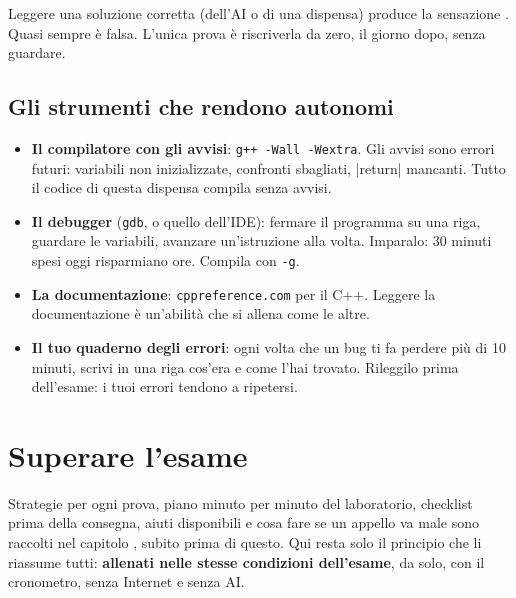 \begin{trappola}
Leggere una soluzione corretta (dell'AI o di una dispensa) produce la sensazione
. Quasi sempre è falsa. L'unica prova è riscriverla da zero,
il giorno dopo, senza guardare.
\end{trappola}

\subsection*{Gli strumenti che rendono autonomi}

\begin{itemize}
  \item \textbf{Il compilatore con gli avvisi}: \texttt{g++ -Wall -Wextra}. Gli avvisi
        sono errori futuri: variabili non inizializzate, confronti sbagliati, \cc|return|
        mancanti. Tutto il codice di questa dispensa compila senza avvisi.
  \item \textbf{Il debugger} (\texttt{gdb}, o quello dell'IDE): fermare il programma su una
        riga, guardare le variabili, avanzare un'istruzione alla volta. Imparalo: 30
        minuti spesi oggi risparmiano ore. Compila con \texttt{-g}.
  \item \textbf{La documentazione}: \texttt{cppreference.com} per il C++. Leggere la
        documentazione è un'abilità che si allena come le altre.
  \item \textbf{Il tuo quaderno degli errori}: ogni volta che un bug ti fa perdere più di
        10 minuti, scrivi in una riga cos'era e come l'hai trovato. Rileggilo prima
        dell'esame: i tuoi errori tendono a ripetersi.
\end{itemize}

\section{Superare l'esame}

Strategie per ogni prova, piano minuto per minuto del laboratorio, checklist
prima della consegna, aiuti disponibili e cosa fare se un appello va male sono
raccolti nel capitolo , subito prima di
questo. Qui resta solo il principio che li riassume tutti: \textbf{allenati nelle
stesse condizioni dell'esame}, da solo, con il cronometro, senza Internet e senza AI.

